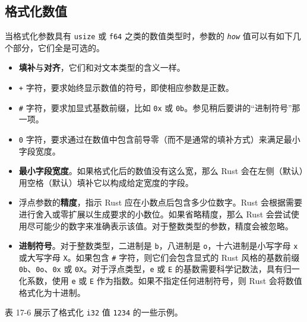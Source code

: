 \subsection{格式化数值}

当格式化参数具有 \texttt{usize} 或 \texttt{f64} 之类的数值类型时，参数的 \emph{\texttt{how}} 值可以有如下几个部分，它们全是可选的。

\begin{itemize}
\item \textbf{填补}与\textbf{对齐}，它们和对文本类型的含义一样。
\item \texttt{+} 字符，要求始终显示数值的符号，即使相应参数是正数。
\item \texttt{\#} 字符，要求加显式基数前缀，比如 \texttt{0x} 或 \texttt{0b}。参见稍后要讲的“进制符号”那一项。
\item \texttt{0} 字符，要求通过在数值中包含前导零（而不是通常的填补方式）来满足最小字段宽度。
\item \textbf{最小字段宽度}。如果格式化后的数值没有这么宽，那么 Rust 会在左侧（默认）用空格（默认）填补它以构成给定宽度的字段。
\item 浮点参数的\textbf{精度}，指示 Rust 应在小数点后包含多少位数字。Rust 会根据需要进行舍入或零扩展以生成要求的小数位。如果省略精度，那么 Rust 会尝试使用尽可能少的数字来准确表示该值。对于整数类型的参数，精度会被忽略。
\item \textbf{进制符号}。对于整数类型，二进制是 \texttt{b}，八进制是 \texttt{o}，十六进制是小写字母 \texttt{x} 或大写字母 \texttt{X}。如果包含 \texttt{\#} 字符，则它们会包含显式的 Rust 风格的基数前缀 \texttt{0b}、\texttt{0o}、\texttt{0x} 或 \texttt{0X}。对于浮点类型，\texttt{e} 或 \texttt{E} 的基数需要科学记数法，具有归一化系数，使用 \texttt{e} 或 \texttt{E} 作为指数。如果不指定任何进制符号，则 Rust 会将数值格式化为十进制。
\end{itemize}

表 17-6 展示了格式化 \texttt{i32} 值 \texttt{1234} 的一些示例。


